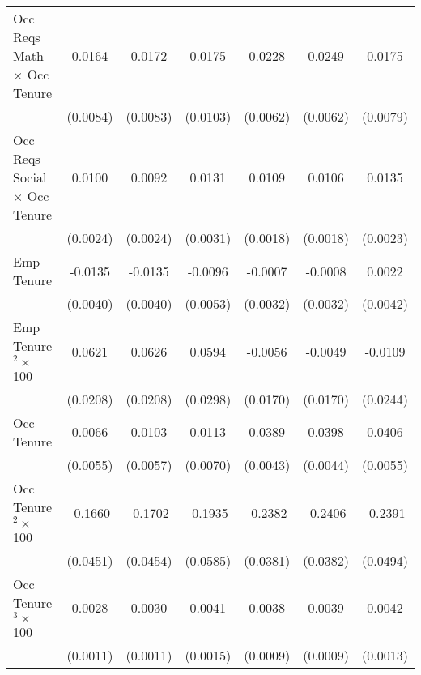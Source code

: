 {\begin{longtable}{l*{6}{c}}
Occ Reqs Math $\times$ Occ Tenure&      0.0164\sym{*}  &      0.0172\sym{**} &      0.0175\sym{*}  &      0.0228\sym{***}&      0.0249\sym{***}&      0.0175\sym{**} \\
                    &    (0.0084)         &    (0.0083)         &    (0.0103)         &    (0.0062)         &    (0.0062)         &    (0.0079)         \\
Occ Reqs Social $\times$ Occ Tenure&      0.0100\sym{***}&      0.0092\sym{***}&      0.0131\sym{***}&      0.0109\sym{***}&      0.0106\sym{***}&      0.0135\sym{***}\\
                    &    (0.0024)         &    (0.0024)         &    (0.0031)         &    (0.0018)         &    (0.0018)         &    (0.0023)         \\
Emp Tenure          &     -0.0135\sym{***}&     -0.0135\sym{***}&     -0.0096\sym{*}  &     -0.0007         &     -0.0008         &      0.0022         \\
                    &    (0.0040)         &    (0.0040)         &    (0.0053)         &    (0.0032)         &    (0.0032)         &    (0.0042)         \\
Emp Tenure$^2\times$ 100&      0.0621\sym{***}&      0.0626\sym{***}&      0.0594\sym{**} &     -0.0056         &     -0.0049         &     -0.0109         \\
                    &    (0.0208)         &    (0.0208)         &    (0.0298)         &    (0.0170)         &    (0.0170)         &    (0.0244)         \\
Occ Tenure          &      0.0066         &      0.0103\sym{*}  &      0.0113         &      0.0389\sym{***}&      0.0398\sym{***}&      0.0406\sym{***}\\
                    &    (0.0055)         &    (0.0057)         &    (0.0070)         &    (0.0043)         &    (0.0044)         &    (0.0055)         \\
Occ Tenure$^2\times$ 100&     -0.1660\sym{***}&     -0.1702\sym{***}&     -0.1935\sym{***}&     -0.2382\sym{***}&     -0.2406\sym{***}&     -0.2391\sym{***}\\
                    &    (0.0451)         &    (0.0454)         &    (0.0585)         &    (0.0381)         &    (0.0382)         &    (0.0494)         \\
Occ Tenure$^3\times$ 100&      0.0028\sym{***}&      0.0030\sym{***}&      0.0041\sym{***}&      0.0038\sym{***}&      0.0039\sym{***}&      0.0042\sym{***}\\
                    &    (0.0011)         &    (0.0011)         &    (0.0015)         &    (0.0009)         &    (0.0009)         &    (0.0013)         \\

\end{longtable}}
